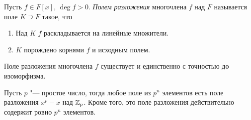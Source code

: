 \documentclass[main]{subfiles}
\begin{document}
\begin{definition}
  Пусть \( f \in F[x] \), \( \deg f > 0 \).
  \emph{Полем разложения} многочлена \( f \)
  над \( F \) называется поле \( K \supseteq F \)
  такое, что
  \begin{enumerate}
    \item Над \( K \) \( f \) раскладывается на линейные множители.
    \item \( K \) порождено корнями \( f \) и исходным полем.
  \end{enumerate}
\end{definition}

\begin{exercise}
  Поле разложения многочлена \( f \) существует и единственно
  с точностью до изоморфизма.
\end{exercise}
\begin{exercise}
  Пусть \( p \) "--- простое число, тогда
  любое поле из \( p^n \) элементов есть
  поле разложения \( x^p - x \) над \( \mathbb{Z}_p \).
  Кроме того, это поле разложения
  действительно содержит ровно \( p^n \) элементов.
\end{exercise}
\end{document}
